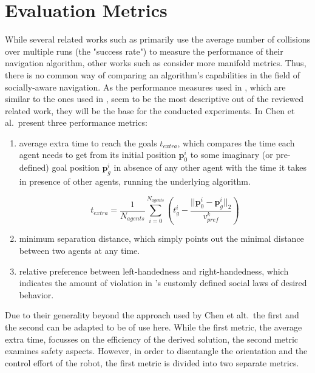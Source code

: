 \section{Evaluation Metrics}
\label{text:experiments/metrics}
While several related works such as \cite{Everett2018}\cite{Vemula2016}\cite{Luo2018a}\cite{Phillips2011} primarily use the average number of collisions over multiple runs (the "success rate") to measure the performance of their navigation algorithm, other works such as \cite{Chen2017}\cite{Nishimura2020a} consider more manifold metrics. Thus, there is no common way of comparing an algorithm's capabilities in the field of socially-aware navigation. As the performance measures used in \cite{Chen2017},  which are similar to the ones used in \cite{Nishimura2020a}, seem to be the most descriptive out of the reviewed related work, they will be the base for the conducted experiments. In \cite{Chen2017} Chen et al.\ present three performance metrics: 

\begin{enumerate}
\item average extra time to reach the goals $t_{extra}$, which compares the time each agent needs to get from its initial position $\boldsymbol{p}^i_0$ to some imaginary (or pre-defined) goal position $\boldsymbol{p}^i_g$ in absence of any other agent with the time it takes in presence of other agents, running the underlying algorithm.

\begin{equation}
t_{extra} = \frac{1}{N_{agents}} \sum_{i=0}^{N_{agents}} \left( t_g^i - \frac{||\boldsymbol{p}^i_0 - \boldsymbol{p}^i_g||_2}{v^k_{pref}} \right)
\label{eq:t_extra}
\end{equation}

\item minimum separation distance, which simply points out the minimal distance between two agents at any time.
\item relative preference between left-handedness and right-handedness, which indicates the amount of violation in \cite{Chen2017}'s customly defined social laws of desired behavior.
\end{enumerate}

Due to their generality beyond the approach used by Chen et alt.\, the first and the second can be adapted to be of use here. While the first metric, the average extra time, focusses on the efficiency of the derived solution, the second metric examines safety aspects. However, in order to disentangle the orientation and the control effort of the robot, the first metric is divided into two separate metrics. \\

